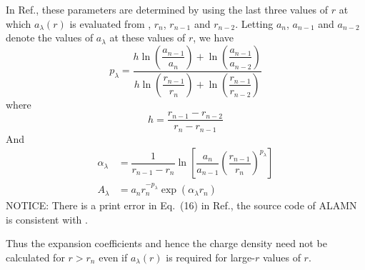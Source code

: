 \documentclass[aps,pra,groupedaddress,
                amsfonts,amssymb,
                preprint
    ]{revtex4}
\begin{document}
In Ref.\cite{MAM1980}, these parameters are determined by using the
last three values of $r$ at which $a_\lambda(r)$ is evaluated from
, $r_n$, $r_{n-1}$ and $r_{n-2}$. Letting $a_n$, $a_{n-1}$ and
$a_{n-2}$ denote the values of $a_\lambda$ at these values of $r$, we
have
\begin{equation}
  \label{eq:plam}
  p_\lambda = \dfrac{h\ln\left(\dfrac{a_{n-1}}{a_n}\right) +
                      \ln\left(\dfrac{a_{n-1}}{a_{n-2}}\right)}
                    {h\ln\left(\dfrac{r_{n-1}}{r_n}\right) +
                      \ln\left(\dfrac{r_{n-1}}{r_{n-2}}\right)} 
\end{equation}
where
\begin{equation}
   h = \dfrac{r_{n-1} - r_{n-2}}{r_n - r_{n-1}}
 \end{equation}
And
\begin{align}
  \label{eq:alphlam}
  \alpha_\lambda &= \dfrac{1}{r_{n-1} - r_n}
                    \ln\left[\dfrac{a_n}{a_{n-1}}
                       \left(\dfrac{r_{n-1}}{r_n}\right)^{p_\lambda}\right] \\
  \label{eq:Alam}
  A_\lambda & = a_nr_n^{-p_\lambda}\exp(\alpha_\lambda r_n)
\end{align}
NOTICE: There is a print error in Eq.~(16) in Ref.\cite{MAM1980},
the source code of ALAMN is consistent with .

Thus the expansion coefficients and hence the charge density need not be
calculated for $r > r_n$ even if $a_\lambda(r)$ is required for large-$r$
values of $r$.
\end{document}
